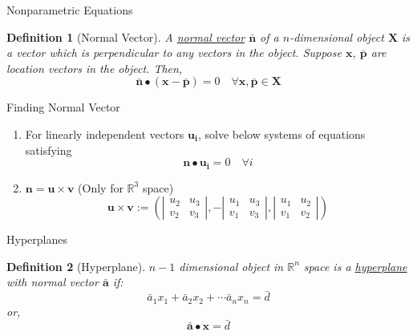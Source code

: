 \documentclass[a4paper,11pt]{article}
\newtheorem{defn}{Definition}
\begin{document}
\begin{frame}[t]{Nonparametric Equations}
	\begin{defn}
		[Normal Vector]
		A \uline{normal vector} $\bar{\mathbf{n}}$ of a $n$-dimensional object $\mathbf{X}$ is a vector which is perpendicular to any vectors in the object. Suppose $\mathbf{x}$, $\bar{\mathbf{p}}$ are location vectors in the object. Then, \[
			\bar{\mathbf{n}}\bullet(\mathbf{x}-\bar{\mathbf{p}})=0\quad \forall \mathbf{x,\bar{p}}\in\mathbf{X}
		\]
	\end{defn}
	\begin{block}
		{Finding Normal Vector}
		\begin{enumerate}
			\item For linearly independent vectors $\mathbf{u_i}$, solve below systems of equations satisfying \[
				\mathbf{n}\bullet\mathbf{u_i}=0 \quad\forall i
			\] 
			\item $\mathbf{n}=\mathbf{u} \times \mathbf{v}$ (Only for $\mathbb{R}^3$ space)
			\[
				\mathbf{u} \times \mathbf{v} := \left(\left|\begin{matrix}
					u_2 & u_3 \\ v_2 & v_3
				\end{matrix}\right|,-\left|\begin{matrix}
					u_1&u_3\\ v_1 & v_3 
				\end{matrix}\right|,\left|\begin{matrix}
					u_1&u_2\\v_1&v_2
				\end{matrix}\right|\right)
			\]
		\end{enumerate}
	\end{block}
\end{frame}

\begin{frame}[t]{Hyperplanes}
	\begin{defn}
		[Hyperplane]
		$n-1$ dimensional object in $\mathbb{R}^n$ space is a \uline{hyperplane} with normal vector $\bar{\mathbf{a}}$ if:\[
			\bar{a}_1 x_1+\bar{a}_2 x_2+\cdots\bar{a}_n x_n = \bar d
		\]or, \[
			\bar{\mathbf{a}}\bullet\mathbf{x}=\bar d
		\]
	\end{defn}
\end{frame}
\end{document}
